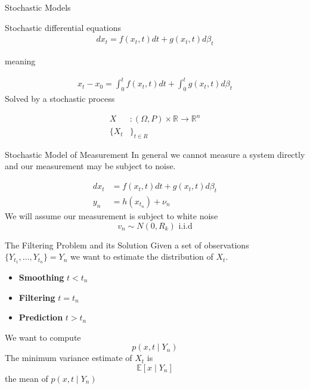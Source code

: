 \documentclass{beamer}
\newcommand{\R}{\mathbb{R}} \newcommand{\E}{\operatorname{E}}
\begin{document}
\begin{frame}{Stochastic Models}

    \pause
    Stochastic differential equations
    \begin{align}
      dx_t = f(x_t,t) dt + g(x_t,t) d\beta_t
    \end{align}

    meaning

    \begin{align}
      x_t - x_0 = \int_0^tf(x_t,t) dt + \int_0^tg(x_t,t) d\beta_t
    \end{align}
    \pause
    Solved by a stochastic process

    \begin{align}
      X &: (\Omega,P) \times \R \to \R^n \\
      \{X_t &\}_{t\in R} 
    \end{align}
  


\end{frame}

\begin{frame}{Stochastic Model of Measurement}
  In general we cannot measure a system directly and our measurement may be
  subject to noise.

  \pause

  \begin{align}
    dx_t &= f(x_t,t) dt + g(x_t,t) d\beta_t \\
    y_n  &= h(x_{t_n}) + \nu_n
  \end{align}
  \pause We will assume our measurement is subject to white noise
  \begin{equation}
    v_n \sim N(0,R_k) \text{ i.i.d}
  \end{equation}
\end{frame}

\begin{frame}{The Filtering Problem and its Solution}
  Given a set of observations $\{Y_{t_1},\dots,Y_{t_n}\} = Y_{n}$ we want to
  estimate the distribution of $X_t$.

  \pause
  \begin{itemize}
    \pause
  \item \textbf{Smoothing} $t < t_n$ \pause
  \item \textbf{Filtering} $t = t_n$ \pause
  \item \textbf{Prediction} $t > t_n$
  \end{itemize}

  \pause We want to compute
  \begin{equation}
    p(x,t \mid Y_n)
  \end{equation}
  \pause The minimum variance estimate of $X_t$ is
  \begin{equation}
    \mathbb{E}[x \mid Y_n]
  \end{equation}
  the mean of $p(x,t \mid Y_{n})$
\end{frame}
\end{document}
